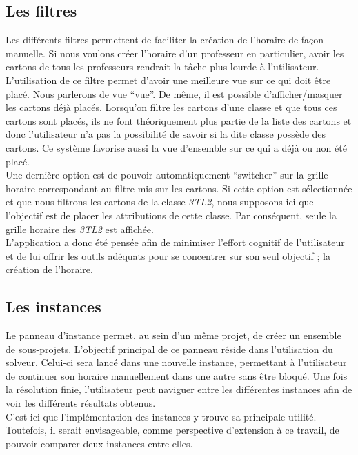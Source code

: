 \subsection{Les filtres}
Les différents filtres permettent de faciliter la création de l'horaire de façon manuelle. Si nous voulons créer l'horaire d'un professeur en particulier, avoir les cartons de tous les professeurs rendrait la tâche plus lourde à l'utilisateur. L'utilisation de ce filtre permet d'avoir une meilleure vue sur ce qui doit être placé. Nous parlerons de vue \enquote{vue}.
\newline
\indent
De même, il est possible d'afficher/masquer les cartons déjà placés. Lorsqu'on filtre les cartons d'une classe et que tous ces cartons sont placés, ils ne font théoriquement plus partie de la liste des cartons et donc l'utilisateur n'a pas la possibilité de savoir si la dite classe possède des cartons. Ce système favorise aussi la vue d'ensemble sur ce qui a déjà ou non été placé.\\
\newline
\indent
Une dernière option est de pouvoir automatiquement \enquote{switcher} sur la grille horaire correspondant au filtre mis sur les cartons. Si cette option est sélectionnée et que nous filtrons les cartons de la classe \textit{3TL2}, nous supposons ici que l'objectif est de placer les attributions de cette classe. Par conséquent, seule la grille horaire des \textit{3TL2} est affichée.\\
\newline
\indent
L'application a donc été pensée afin de minimiser l'effort cognitif de l'utilisateur et de lui offrir les outils adéquats pour se concentrer sur son seul objectif ; la création de l'horaire.


\subsection{Les instances}

Le panneau d'instance permet, au sein d'un même projet, de créer un ensemble de 
sous-projets. L'objectif principal de ce panneau réside dans l'utilisation du solveur. Celui-ci sera lancé dans une nouvelle instance, permettant à l'utilisateur de continuer son horaire manuellement dans une autre sans être bloqué. Une fois la résolution finie, l'utilisateur peut naviguer entre les différentes instances afin de voir les différents résultats obtenus. \\
\newline
\indent
C'est ici que l'implémentation des instances y trouve sa principale utilité. Toutefois, il serait envisageable, comme perspective d'extension à ce travail, de pouvoir comparer deux instances entre elles.\\
\newline
\indent

